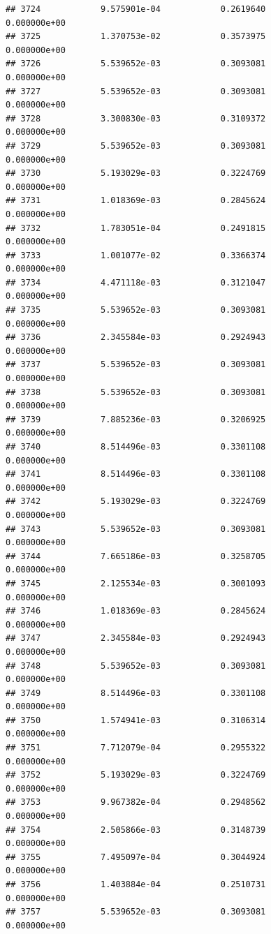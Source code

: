 \documentclass[
]{article}
\begin{document}
\begin{verbatim}
## 3724            9.575901e-04            0.2619640            0.000000e+00
## 3725            1.370753e-02            0.3573975            0.000000e+00
## 3726            5.539652e-03            0.3093081            0.000000e+00
## 3727            5.539652e-03            0.3093081            0.000000e+00
## 3728            3.300830e-03            0.3109372            0.000000e+00
## 3729            5.539652e-03            0.3093081            0.000000e+00
## 3730            5.193029e-03            0.3224769            0.000000e+00
## 3731            1.018369e-03            0.2845624            0.000000e+00
## 3732            1.783051e-04            0.2491815            0.000000e+00
## 3733            1.001077e-02            0.3366374            0.000000e+00
## 3734            4.471118e-03            0.3121047            0.000000e+00
## 3735            5.539652e-03            0.3093081            0.000000e+00
## 3736            2.345584e-03            0.2924943            0.000000e+00
## 3737            5.539652e-03            0.3093081            0.000000e+00
## 3738            5.539652e-03            0.3093081            0.000000e+00
## 3739            7.885236e-03            0.3206925            0.000000e+00
## 3740            8.514496e-03            0.3301108            0.000000e+00
## 3741            8.514496e-03            0.3301108            0.000000e+00
## 3742            5.193029e-03            0.3224769            0.000000e+00
## 3743            5.539652e-03            0.3093081            0.000000e+00
## 3744            7.665186e-03            0.3258705            0.000000e+00
## 3745            2.125534e-03            0.3001093            0.000000e+00
## 3746            1.018369e-03            0.2845624            0.000000e+00
## 3747            2.345584e-03            0.2924943            0.000000e+00
## 3748            5.539652e-03            0.3093081            0.000000e+00
## 3749            8.514496e-03            0.3301108            0.000000e+00
## 3750            1.574941e-03            0.3106314            0.000000e+00
## 3751            7.712079e-04            0.2955322            0.000000e+00
## 3752            5.193029e-03            0.3224769            0.000000e+00
## 3753            9.967382e-04            0.2948562            0.000000e+00
## 3754            2.505866e-03            0.3148739            0.000000e+00
## 3755            7.495097e-04            0.3044924            0.000000e+00
## 3756            1.403884e-04            0.2510731            0.000000e+00
## 3757            5.539652e-03            0.3093081            0.000000e+00

\end{verbatim}
\end{document}

